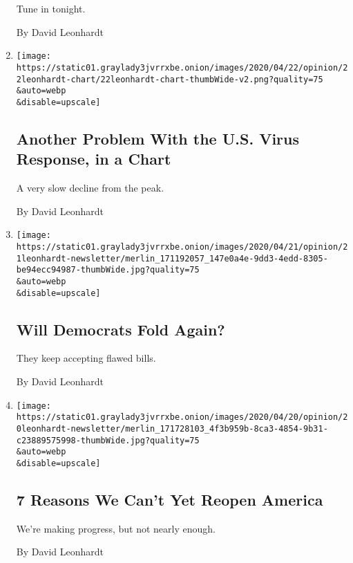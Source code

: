 \begin{enumerate}
  Tune in tonight.

  By David Leonhardt
\item
  \href{/2020/04/22/opinion/coronavirus-us-cases.html}{}

  \texttt{[image: https://static01.graylady3jvrrxbe.onion/images/2020/04/22/opinion/22leonhardt-chart/22leonhardt-chart-thumbWide-v2.png?quality=75\\\&auto=webp\\\&disable=upscale]}

  \hypertarget{another-problem-with-the-us-virus-response-in-a-chart}{%
  \subsection{Another Problem With the U.S. Virus Response, in a
  Chart}\label{another-problem-with-the-us-virus-response-in-a-chart}}

  A very slow decline from the peak.

  By David Leonhardt
\item
  \href{/2020/04/21/opinion/coronavirus-stimulus-democrats.html}{}

  \texttt{[image: https://static01.graylady3jvrrxbe.onion/images/2020/04/21/opinion/21leonhardt-newsletter/merlin\_171192057\_147e0a4e-9dd3-4edd-8305-be94ecc94987-thumbWide.jpg?quality=75\\\&auto=webp\\\&disable=upscale]}

  \hypertarget{will-democrats-fold-again}{%
  \subsection{Will Democrats Fold
  Again?}\label{will-democrats-fold-again}}

  They keep accepting flawed bills.

  By David Leonhardt
\item
  \href{/2020/04/20/opinion/coronavirus-reopen-economy.html}{}

  \texttt{[image: https://static01.graylady3jvrrxbe.onion/images/2020/04/20/opinion/20leonhardt-newsletter/merlin\_171728103\_4f3b959b-8ca3-4854-9b31-c23889575998-thumbWide.jpg?quality=75\\\&auto=webp\\\&disable=upscale]}

  \hypertarget{7-reasons-we-cant-yet-reopen-america}{%
  \subsection{7 Reasons We Can't Yet Reopen
  America}\label{7-reasons-we-cant-yet-reopen-america}}

  We're making progress, but not nearly enough.

  By David Leonhardt
\end{enumerate}

